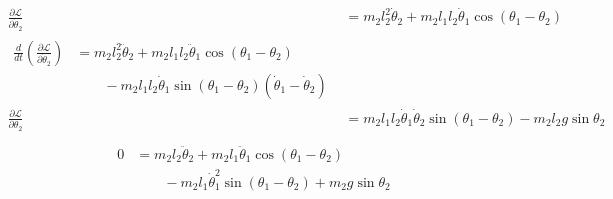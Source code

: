 \begin{align}
	\frac{\partial \mathcal{L}}{\partial \dot\theta_2}&=m_2l_2^2\dot\theta_2+m_2l_1l_2\dot\theta_1\cos{(\theta_1-\theta_2)}\\
	\begin{split}
		\frac{d}{dt}\left(\frac{\partial \mathcal{L}}{\partial \dot\theta_2}\right)&=m_2l_2^2\ddot\theta_2+m_2l_1l_2\ddot\theta_1\cos{(\theta_1-\theta_2)}\\
		&\qquad -m_2l_1l_2\dot\theta_1\sin{(\theta_1-\theta_2)}(\dot\theta_1-\dot\theta_2)
	\end{split}\\
	\frac{\partial \mathcal{L}}{\partial \theta_2} &=m_2l_1l_2\dot\theta_1\dot\theta_2\sin{(\theta_1-\theta_2)}-m_2l_2g\sin{\theta_2}\\
	\label{eq:part}
\end{align}
\begin{align}
	\begin{split}
		0&=m_2l_2\ddot\theta_2+m_2l_1\ddot\theta_1\cos{(\theta_1-\theta_2)}\\
		&\qquad-m_2l_1\dot\theta_1^2\sin{(\theta_1-\theta_2)}+m_2g\sin{\theta_2}
	\end{split}
\end{align}
